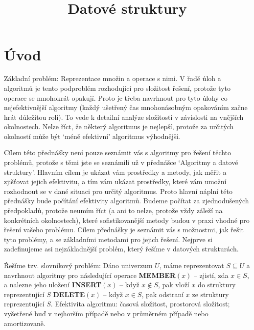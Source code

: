 \documentclass[a4paper,12pt]{article}
\begin{document}
     

\newtheorem*{dusledek}{Důsledek}
\newtheorem*{lemma}{Lemma}
\newtheorem*{veta}{Věta}
\newtheorem*{tvrzeni}{Tvrzení}

\def \emph#1{\underbar{#1}}
\def \Prob{\operatorname{Prob}}
\def \var{\operatorname{var}}

\title{Datové struktury}
\date{}
\maketitle

\section{Úvod}

Základní problém: Reprezentace množin a 
operace s nimi. V řadě úloh a algoritmů je tento 
podproblém rozhodující pro složitost řešení, protože 
tyto operace se mnohokrát opakují. Proto je třeba 
navrhnout pro tyto úlohy co nejefektivnější algoritmy 
(každý ušetřený čas mnohonásobným opakováním začne 
hrát důležitou roli). To vede k detailní 
analýze složitosti v závislosti na vnějších okolnostech. 
Nelze říct, 
že některý algoritmus je nejlepší, protože za určitých 
okolností může být `méně efektivní' algoritmus 
výhodnější.

Cílem této přednášky není pouze seznámit vás s algoritmy 
pro řešení těchto problémů, protože s těmi jste se 
seznámili už v přednášce `Algoritmy a datové struktury'. Hlavním cílem 
je ukázat vám prostředky a metody, jak měřit a zjiš\v tovat 
jejich efektivitu, a tím vám ukázat prostřed\-ky, které vám 
umožní rozhodnout se v dané situaci pro určitý algoritmus. 
Proto hlavní náplní této přednášky bude počítání efektivity 
algoritmů. Budeme počítat za 
zjednoduše\-ných 
předpokladů, protože neumím říct (a ani to nelze, protože vždy záleží 
na konkrétních okolnostech), které sofistikovanější metody 
budou v praxi vhodné pro řešení vašeho problému. Cílem přednášky je 
seznámit vás s možnostmi, jak řešit tyto problémy, a se základními 
metodami pro jejich řešení. Nejprve si zadefinujeme asi 
nejzákladnější problém, který řešíme v datových strukturách. 

Řešíme tzv. slovníkový problém: Dáno 
univerzum $U$, máme reprezentovat $S\subseteq U$ a navrhnout algoritmy pro 
násle\-dující operace\newline 
{\bf MEMBER$(x)$} -- zjistí, zda $x\in S$, a nalezne jeho 
uložení\newline 
{\bf INSERT$(x)$} -- když $x\notin S$, pak vloží $x$ do struktury 
repre\-zentující $S$\newline 
{\bf DELETE$(x)$} -- když $x\in S$, pak odstraní $x$ ze struktury 
reprezentující $S$.\newline 
Efektivita algoritmu: časová složitost, prostorová 
složitost;\newline 
vy\-šetřené buď v nejhorším případě nebo v 
průměrném případě nebo amortizovaně.
\end{document}
